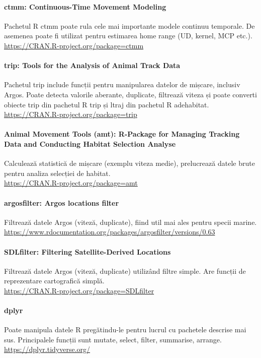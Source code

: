 \documentclass[11pt,onehalfspacing]{elife}
\begin{document}
\paragraph{ctmm: Continuous-Time Movement Modeling}
Pachetul R ctmm poate rula cele mai importante modele continuu temporale. De asemenea poate fi utilizat pentru estimarea home range (UD, kernel, MCP etc.).\\
\url{https://CRAN.R-project.org/package=ctmm}

\paragraph{trip: Tools for the Analysis of Animal Track Data}
Pachetul trip include funcții pentru manipularea datelor de mișcare, inclusiv Argos. Poate detecta valorile aberante, duplicate, filtrează viteza și poate converti obiecte trip din pachetul R trip și ltraj din pachetul R adehabitat.\\
\url{https://CRAN.R-project.org/package=trip}

\paragraph{Animal Movement Tools (amt): R-Package for Managing Tracking Data and Conducting Habitat Selection Analyse}
Calculează statistică de mișcare (exemplu viteza medie), prelucrează datele brute pentru analiza selecției de habitat.\\
\url{https://CRAN.R-project.org/package=amt}

\paragraph{argosfilter: Argos locations filter}

Filtrează datele Argos (viteză, duplicate), fiind util mai ales pentru specii marine.\\
\url{https://www.rdocumentation.org/packages/argosfilter/versions/0.63} 

\paragraph{SDLfilter: Filtering Satellite-Derived Locations}
Filtrează datele Argos (viteză, duplicate) utilizând filtre simple. Are funcții de reprezentare cartografică simplă.\\
\url{https://CRAN.R-project.org/package=SDLfilter}

\paragraph{dplyr}
Poate manipula datele R pregătindu-le pentru lucrul cu pachetele descrise mai sus. Principalele funcții sunt mutate, select, filter, summarise, arrange.\\
\url{https://dplyr.tidyverse.org/}
\end{document}
